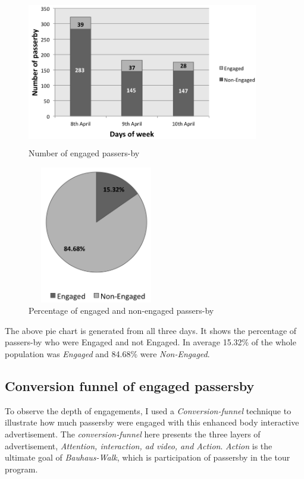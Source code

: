 \begin{figure}[H]
    \centering
    \includegraphics[width=0.9\textwidth,height=6.5cm]{Figures/9/newbody_inter_engage_day}
    \caption{Number of engaged passers-by}%
    \label{fig:newbodyengagedandengagedby}%
\end{figure}


\begin{figure}[H]
    \centering
    \includegraphics[width=60mm,height=60mm]{Figures/9/newbody_eng_percentage}
    \caption{Percentage of engaged and non-engaged passers-by}%
    \label{fig:newbodyengagedpasserbypercentage}%
\end{figure}

The above pie chart is generated from all three days. It shows the percentage of passers-by who were Engaged and not Engaged. In average 15.32\% of the whole population was \emph{Engaged} and 84.68\% were \emph{Non-Engaged}.


\subsection{Conversion funnel of engaged passersby}
To observe the depth of engagements, I used a \emph{Conversion-funnel} \cite{convfunnel} technique to illustrate how much passersby were engaged with this enhanced body interactive advertisement. The \emph{conversion-funnel} here presents the three layers of advertisement, \emph{Attention, interaction, ad video, and Action}. \emph{Action} is the ultimate goal of \emph{Bauhaus-Walk}, which is participation of passersby in the tour program. 

